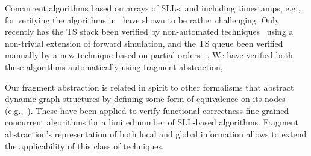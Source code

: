 Concurrent algorithms based on arrays of SLLs, and including timestamps, e.g.,
for verifying the algorithms in~\cite{ts-stack} have shown to be rather challenging. Only
recently has the TS stack been verified by non-automated
techniques~\cite{BEEM:cav17} using a non-trivial extension of
forward simulation, and the TS queue been verified manually by a new technique
based on partial orders~\cite{Khyzha:esop17,singh:issre16}..
We have verified both these algorithms automatically using fragment abstraction,

Our fragment abstraction is related in spirit to other formalisms that
abstract dynamic graph structures by defining some form of equivalence on
its nodes (e.g.,~\cite{spotlight07,SagivRW02}). These have
been applied to verify functional correctness fine-grained concurrent
algorithms for a limited number of SLL-based algorithms. Fragment
abstraction's representation of both local and global information allows to
extend the applicability of this class of techniques.



